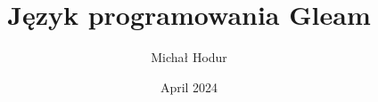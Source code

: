 \documentclass[a4paper,12pt]{book}
\begin{document}
\author{Michał Hodur}
\title{Język programowania Gleam}
\date{April 2024}

\frontmatter
\maketitle
\tableofcontents

\mainmatter



\backmatter
\end{document}
